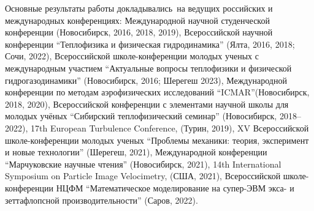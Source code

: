 {\probation}
Основные результаты работы докладывались~на ведущих российских и международных конференциях:
Международной научной студенческой конференции (Новосибирск, 2016, 2018, 2019),
Всероссийской научной конференции ``Теплофизика и физическая гидродинамика'' (Ялта, 2016, 2018; Сочи, 2022),
Всероссийской школе-конференции молодых ученых с международным участием ``Актуальные вопросы теплофизики и физической гидрогазодинамики'' (Новосибирск, 2016; Шерегеш 2023),
Международной конференции по методам аэрофизических исследований ``ICMAR''(Новосибирск, 2018, 2020),
Всероссийской конференции с элементами научной школы для молодых учёных ``Сибирский теплофизический семинар'' (Новосибирск, 2018--2022),
17th European Turbulence Conference, (Турин, 2019),
XV Всероссийской школе-конференции молодых ученых ``Проблемы механики: теория, эксперимент и новые технологии'' (Шерегеш, 2021),
Международной конференции ``Марчуковские научные чтения'' (Новосибирск, 2021),
14th International Symposium on Particle Image Velocimetry, (США, 2021),
Всероссийской школе-конференции НЦФМ ``Математическое моделирование на супер-ЭВМ экса- и зеттафлопсной производительности'' (Саров, 2022).




